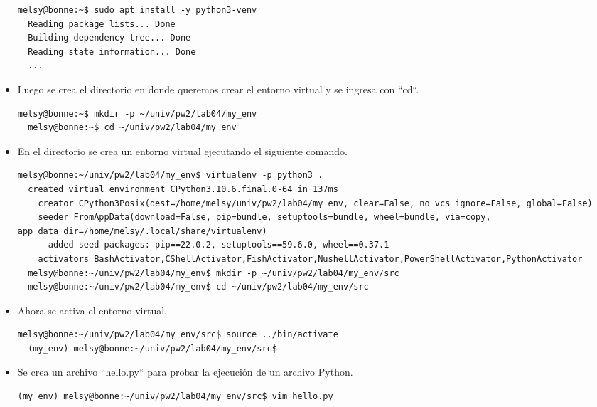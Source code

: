 \documentclass{article}
\begin{document}
\begin{itemize}
  \begin{lstlisting}[style=shell]
  melsy@bonne:~$ sudo apt install -y python3-venv
  Reading package lists... Done
  Building dependency tree... Done
  Reading state information... Done
  ...
  \end{lstlisting}
  
  \item Luego se crea el directorio en donde queremos crear el entorno virtual y se ingresa con ``cd``.

  \begin{lstlisting}[style=shell]
  melsy@bonne:~$ mkdir -p ~/univ/pw2/lab04/my_env
  melsy@bonne:~$ cd ~/univ/pw2/lab04/my_env
  \end{lstlisting}
  
  \item En el directorio se crea un entorno virtual ejecutando el siguiente comando.

  \begin{lstlisting}[style=shell]
  melsy@bonne:~/univ/pw2/lab04/my_env$ virtualenv -p python3 .
  created virtual environment CPython3.10.6.final.0-64 in 137ms
    creator CPython3Posix(dest=/home/melsy/univ/pw2/lab04/my_env, clear=False, no_vcs_ignore=False, global=False)
    seeder FromAppData(download=False, pip=bundle, setuptools=bundle, wheel=bundle, via=copy, app_data_dir=/home/melsy/.local/share/virtualenv)
      added seed packages: pip==22.0.2, setuptools==59.6.0, wheel==0.37.1
    activators BashActivator,CShellActivator,FishActivator,NushellActivator,PowerShellActivator,PythonActivator
  melsy@bonne:~/univ/pw2/lab04/my_env$ mkdir -p ~/univ/pw2/lab04/my_env/src
  melsy@bonne:~/univ/pw2/lab04/my_env$ cd ~/univ/pw2/lab04/my_env/src
  \end{lstlisting}
  
  \item Ahora se activa el entorno virtual.

  \begin{lstlisting}[style=shell]
  melsy@bonne:~/univ/pw2/lab04/my_env/src$ source ../bin/activate
  (my_env) melsy@bonne:~/univ/pw2/lab04/my_env/src$
  \end{lstlisting}
  
  \item Se crea un archivo ``hello.py`` para probar la ejecución de un archivo Python.

  \begin{lstlisting}[style=shell]
  (my_env) melsy@bonne:~/univ/pw2/lab04/my_env/src$ vim hello.py
  \end{lstlisting}
  

\end{itemize}
\end{document}
